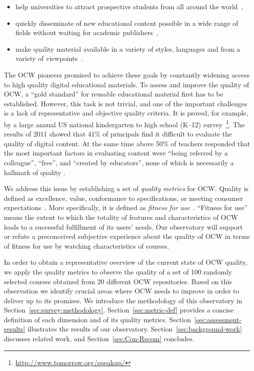 \documentclass{sig-alternate}
\theoremstyle{definition}
\begin{document}
\begin{itemize}
\item help universities to attract prospective students from all around the world~\parencite{MITNews2001},
\item quickly disseminate of new educational content possible in a wide range of fields without waiting for academic publishers~\parencite{MITNews2001},
\item make quality material available in a variety of styles, languages and from a variety of viewpoints~\parencite{Caswell2008}.
\end{itemize}

The OCW pioneers promised to achieve these goals by constantly widening access to high quality digital educational materials.
To assess and improve the quality of OCW, a ``gold standard'' for reusable educational material first has to be established.
However, this task is not trivial, and one of the important challenges is a lack of representative and objective quality criteria.
It is proved, for example, by a large annual US national kindergarten to high school (K–12) survey~\footnote{\url{http://www.tomorrow.org/speakup/}}.
The results of 2011 showed that 41\% of principals find it difficult to evaluate the quality of digital content.
At the same time above 50\% of teachers responded that the most important factors in evaluating content were “being referred by a colleague”, “free”, and “created by educators”, none of which is necessarily a hallmark of quality \parencite{Porcello2013}.

We address this issue by establishing a set of \emph{quality metrics} for OCW.
Quality is defined as excellence, value, conformance to specifications, or meeting consumer expectations~\parencite{Kahn2002}.
More specifically, it is defined as \emph{fitness for use}~\parencite{Juran1974,knight2005}.
``Fitness for use'' means the extent to which the totality of features and characteristics of OCW leads to a successful fulfillment of its users' needs.
Our observatory will support or refute a preconceived subjective experience about the quality of OCW in terms of fitness for use by watching characteristics of courses.

In order to obtain a representative overview of the current state of OCW quality, we apply the quality metrics to observe the quality of a set of 100 randomly selected courses obtained from 20 different OCW repositories.
Based on this observation we identify crucial areas where OCW needs to improve in order to deliver up to its promises.
We introduce the methodology of this observatory in Section~\ref{sec:survey-methodology}.
Section~\ref{sec:metric-def} provides a concise definition of each dimension and of its quality metrics.
Section~\ref{sec:assessment-results} illustrates the results of our observatory.
Section~\ref{sec:background-work} discusses related work, and Section~\ref{sec:Con-Recom} concludes.
\end{document}
